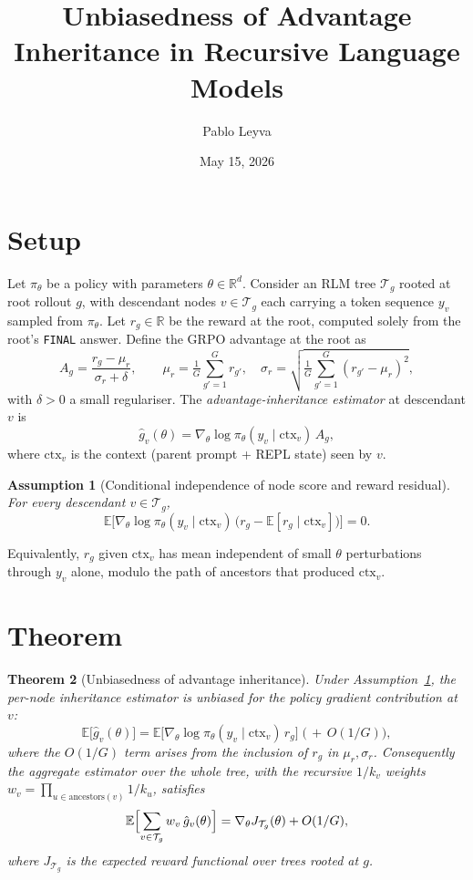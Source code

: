 \documentclass[11pt]{article}
\title{Unbiasedness of Advantage Inheritance in Recursive Language Models}
\author{Pablo Leyva}
\date{May 15, 2026}
\newtheorem{theorem}{Theorem}
\newtheorem{assumption}[theorem]{Assumption}
\begin{document}
\maketitle

\section*{Setup}

Let $\pi_\theta$ be a policy with parameters $\theta \in \mathbb{R}^d$. Consider
an RLM tree $\mathcal{T}_g$ rooted at root rollout $g$, with descendant nodes
$v \in \mathcal{T}_g$ each carrying a token sequence $y_v$ sampled from
$\pi_\theta$. Let $r_g \in \mathbb{R}$ be the reward at the root, computed
solely from the root's \texttt{FINAL} answer. Define the GRPO advantage at the
root as
\[
A_g = \frac{r_g - \mu_r}{\sigma_r + \delta}, \qquad
\mu_r = \tfrac{1}{G}\sum_{g'=1}^G r_{g'}, \quad
\sigma_r = \sqrt{\tfrac{1}{G}\sum_{g'=1}^G (r_{g'} - \mu_r)^2},
\]
with $\delta > 0$ a small regulariser. The \emph{advantage-inheritance
estimator} at descendant $v$ is
\[
\hat{g}_v(\theta) = \nabla_\theta \log \pi_\theta(y_v \mid \mathrm{ctx}_v)\, A_g,
\]
where $\mathrm{ctx}_v$ is the context (parent prompt + REPL state) seen by $v$.

\begin{assumption}[Conditional independence of node score and reward residual]
\label{ass:star}
For every descendant $v \in \mathcal{T}_g$,
\begin{equation}
\label{eq:star}
\mathbb{E}\bigl[\nabla_\theta \log \pi_\theta(y_v \mid \mathrm{ctx}_v)\,
                 \bigl(r_g - \mathbb{E}[r_g \mid \mathrm{ctx}_v]\bigr)\bigr] = 0.
\end{equation}
\end{assumption}

Equivalently, $r_g$ given $\mathrm{ctx}_v$ has mean independent of small $\theta$
perturbations through $y_v$ alone, modulo the path of ancestors that produced
$\mathrm{ctx}_v$.

\section*{Theorem}

\begin{theorem}[Unbiasedness of advantage inheritance]
\label{thm:unbiased}
Under Assumption~\ref{ass:star}, the per-node inheritance estimator is
unbiased for the policy gradient contribution at $v$:
\[
\mathbb{E}\bigl[\hat g_v(\theta)\bigr]
= \mathbb{E}\bigl[\nabla_\theta \log \pi_\theta(y_v \mid \mathrm{ctx}_v)\,r_g\bigr]
\;\bigl(\,+\,O(1/G)\bigr),
\]
where the $O(1/G)$ term arises from the inclusion of $r_g$ in $\mu_r,\sigma_r$.
Consequently the aggregate estimator over the whole tree, with the recursive
$1/k_v$ weights $w_v = \prod_{u \in \mathrm{ancestors}(v)} 1/k_u$, satisfies
\[
\mathbb{E}\Bigl[\sum_{v \in \mathcal{T}_g} w_v\, \hat g_v(\theta)\Bigr]
= \nabla_\theta J_{\mathcal{T}_g}(\theta) + O(1/G),
\]
where $J_{\mathcal{T}_g}$ is the expected reward functional over trees rooted
at $g$.
\end{theorem}
\end{document}

